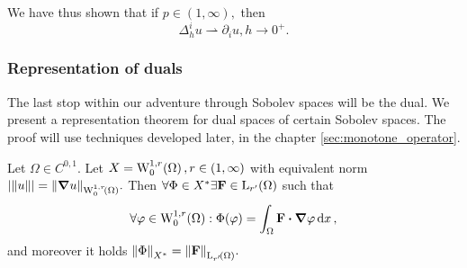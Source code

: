 \documentclass{article}
\begin{document}
\begin{remark}
    We have thus shown that if $p \in (1, \infty),$ then
    \[
	    \Delta_h^i u \rightharpoonup \partial_{i} u, h \to 0^+.
    \]
\end{remark}

\subsubsection{Representation of duals}
\label{sec:dual_representation}

The last stop within our adventure through Sobolev spaces will be the dual. We present a representation theorem for dual spaces of certain Sobolev spaces. The proof will use techniques developed later, in the chapter \ref{sec:monotone_operator}.

\begin{theorem}
	Let $\Omega \in C^{0,1}.$ Let $X = \WkpzeroSet[1][r]{\Omega}, r \in \qty(1,\infty)$ with equivalent norm $|\norm{u}| = \norm{\grad u}_{\WkpzeroSet[1][r]{\Omega}}.$ Then $\forall \Phi \in X^{*} \exists \vb{F} \in \LpSet[r']{\Omega}$ such that
	\[
		\forall \varphi \in \WkpzeroSet[1][r]{\Omega}: \Phi(\varphi) = \int_{\Omega}\vb{F} \vdot \grad \varphi\dd{x},
	\]
	and moreover it holds $ \norm{\Phi}_{X^{*}} = \norm{\vb{F}}_{\LpSet[r']{\Omega}}.$
\end{theorem}
\end{document}
